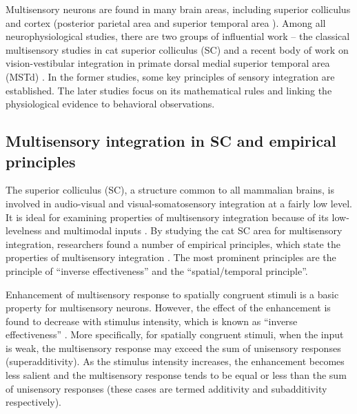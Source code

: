 \documentclass{article}[11pt]
\begin{document}

Multisensory neurons are found in many brain areas, including superior colliculus \cite{stein_merging_1993} and cortex (posterior parietal area \cite{graziano_system_2001} and superior temporal area \cite{alais_multisensory_2010}).
Among all neurophysiological studies, there are two groups of influential work -- the classical multisensory studies in cat superior colliculus (SC) \cite{stein_merging_1993, stein_multisensory_2008} and a recent body of work on vision-vestibular integration in primate dorsal medial superior temporal area (MSTd) \cite{morgan_multisensory_2008, fetsch_visualvestibular_2010}.
In the former studies, some key principles of sensory integration are established. The later studies focus on its mathematical rules and linking the physiological evidence to behavioral observations.


\subsection{Multisensory integration in SC and empirical principles}
The superior colliculus (SC), a structure common to all mammalian brains, is involved in audio-visual and visual-somatosensory integration at a fairly low level. It is ideal for examining properties of multisensory integration because of its low-levelness and multimodal inputs \cite{alais_multisensory_2010}.
By studying the cat SC area for multisensory integration, researchers found a number of empirical principles, which state the properties of multisensory integration \cite{stein_merging_1993}. The most prominent principles are the principle of ``inverse effectiveness'' and the ``spatial/temporal principle''.

Enhancement of multisensory response to spatially congruent stimuli is a basic property for multisensory neurons. However, the effect of the enhancement is found to decrease with stimulus intensity, which is known as ``inverse effectiveness'' \cite{meredith_visual_1986}. More specifically, for spatially congruent stimuli, when the input is weak, the multisensory response may exceed the sum of unisensory responses (superadditivity). As the stimulus intensity increases, the enhancement becomes less salient and the multisensory response tends to be equal or less than the sum of unisensory responses (these cases are termed additivity and subadditivity respectively).
\end{document}
